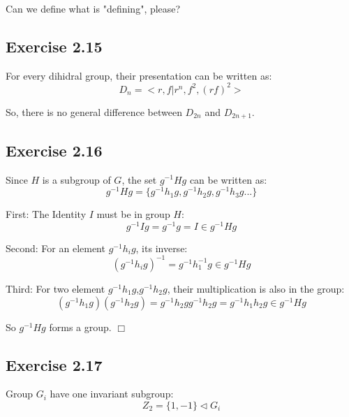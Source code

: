 \documentclass[]{ctexart}
\begin{document}
    Can we define what is "defining", please?
    
    \subsection{Exercise 2.15}
    For every dihidral group, their presentation can be written as:
    \begin{equation*}
      D_n=<r,f|r^n,f^2,(rf)^2>
    \end{equation*}
    
    So, there is no general difference between $D_{2n}$ and $D_{2n+1}$.
    
    \subsection{Exercise 2.16}
    Since $H$ is a subgroup of $ G $, the set $ g^{-1}Hg $ can be written as:
    \begin{equation*}
      g^{-1}Hg=\{g^{-1}h_1g,g^{-1}h_2g,g^{-1}h_3g...\}
    \end{equation*}
    
    First: The Identity $ I $ must be in group $ H $:
    \begin{equation*}
      g^{-1}Ig=g^{-1}g=I\in g^{-1}Hg
    \end{equation*}
    
    Second: For an element $ g^{-1}h_ig $, its inverse:
    \begin{equation*}
      (g^{-1}h_ig)^{-1}=g^{-1}h_1^{-1}g\in g^{-1}Hg
    \end{equation*}
    
    Third: For two element $ g^{-1}h_1g $,$  g^{-1}h_2g $, their multiplication is also in the group:
    \begin{equation*}
      (g^{-1}h_1g)(g^{-1}h_2g)=g^{-1}h_2gg^{-1}h_2g=g^{-1}h_1h_2g\in g^{-1}Hg
    \end{equation*}
    
    So $ g^{-1}Hg $ forms a group. \qquad $ \Box $
    
    \subsection{Exercise 2.17}
    Group $ G_{i} $ have one invariant subgroup:
    \begin{equation*}
      Z_2=\{1,-1\}\lhd G_{i}
    \end{equation*}
    
\end{document}
